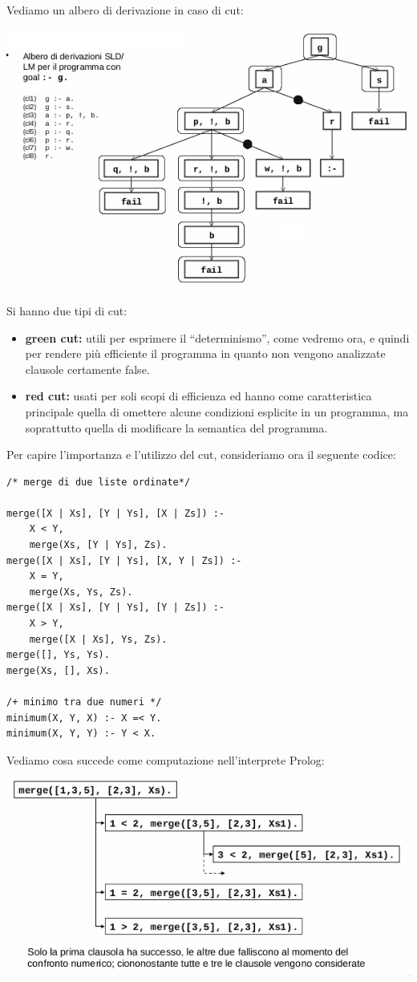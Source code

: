 \documentclass[a4paper]{book}
\begin{document}
Vediamo un albero di derivazione in caso di cut:
\begin{center}
	\includegraphics[scale=0.8]{img/cut.png}
\end{center}
Si hanno due tipi di cut:
\begin{itemize}
\item \textbf{green cut:} utili per esprimere il “determinismo”, come vedremo ora, e quindi per rendere più efficiente il programma
  in quanto non vengono analizzate clausole certamente false.
\item \textbf{red cut:} usati per soli scopi di efficienza ed hanno come caratteristica principale quella di omettere alcune condizioni
                        esplicite in un programma, ma soprattutto  quella di modificare la semantica del programma.
\end{itemize}
Per capire l'importanza e l'utilizzo del cut, consideriamo ora il seguente codice:
\begin{verbatim}
/* merge di due liste ordinate*/

merge([X | Xs], [Y | Ys], [X | Zs]) :-
	X < Y,
	merge(Xs, [Y | Ys], Zs).
merge([X | Xs], [Y | Ys], [X, Y | Zs]) :-
	X = Y,
	merge(Xs, Ys, Zs).
merge([X | Xs], [Y | Ys], [Y | Zs]) :-
	X > Y,
	merge([X | Xs], Ys, Zs).
merge([], Ys, Ys).
merge(Xs, [], Xs).

/+ minimo tra due numeri */
minimum(X, Y, X) :- X =< Y.
minimum(X, Y, Y) :- Y < X.
\end{verbatim}
Vediamo cosa succede come computazione nell'interprete Prolog:
\begin{center}
\includegraphics[scale=0.8]{img/cut2.png}
\end{center}
\end{document}
